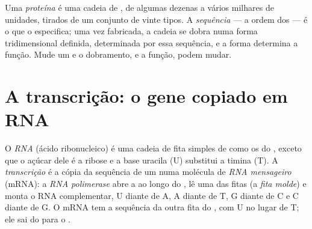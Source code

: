 \begin{definition}\label{def:g11:gene-expression:protein}
Uma \emph{proteína} é uma cadeia de , de
algumas dezenas a vários milhares de unidades, tirados de um conjunto
de vinte tipos. A \emph{sequência} --- a ordem dos  --- é o
que o  especifica; uma vez fabricada, a cadeia se dobra numa forma
tridimensional definida, determinada por essa sequência, e a forma
determina a função. Mude um  e o dobramento, e a função,
podem mudar.
\end{definition}

\section{A transcrição: o gene copiado em RNA}

\begin{definition}\label{def:g11:gene-expression:transcription}
O \emph{RNA} (ácido ribonucleico) é uma cadeia de fita
simples de  como os do , exceto que o açúcar dele é a
ribose e a base uracila (U) substitui a timina (T). A
\emph{transcrição} é a cópia da sequência de um 
numa molécula de \emph{RNA mensageiro} (mRNA): a
 \emph{RNA polimerase} abre a  ao longo do , lê
uma das fitas (a \emph{fita molde}) e monta o RNA complementar, U
diante de A, A diante de T, G diante de C e C diante de G. O mRNA tem a
sequência da outra fita do , com U no lugar de T; ele sai do 
para o .
\end{definition}

